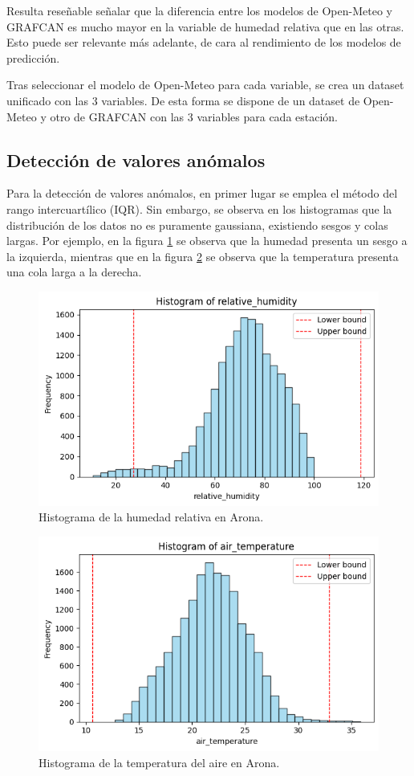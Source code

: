  Resulta reseñable señalar que la diferencia entre los modelos de Open-Meteo y GRAFCAN es mucho mayor en la variable 
 de humedad relativa que en las otras. Esto puede ser relevante más adelante, de cara al rendimiento de los modelos de predicción. 

 \bigskip
 Tras seleccionar el modelo de Open-Meteo para cada variable, se crea un dataset unificado con las 3 variables. De esta forma se dispone 
 de un dataset de Open-Meteo y otro de GRAFCAN con las 3 variables para cada estación.

\subsection{Detección de valores anómalos}
Para la detección de valores anómalos, en primer lugar se emplea el método del rango intercuartílico (IQR). 
Sin embargo, se observa en los histogramas que la distribución de los datos no es puramente gaussiana, existiendo sesgos y colas largas.
Por ejemplo, en la figura \ref{histogram_1} se observa que la humedad presenta un sesgo a la izquierda, mientras que en la figura 
\ref{histogram_2} se observa que la temperatura presenta una cola larga a la derecha.

\begin{figure}
    \centering
    \includegraphics[width=.5\linewidth]{images/histogram_humidity.png}
    \caption{Histograma de la humedad relativa en Arona.}
    \label{histogram_1}
\end{figure}

\begin{figure}
    \centering
    \includegraphics[width=.5\linewidth]{images/histogram_temperature.png}
    \caption{Histograma de la temperatura del aire en Arona.}
    \label{histogram_2}
\end{figure}

